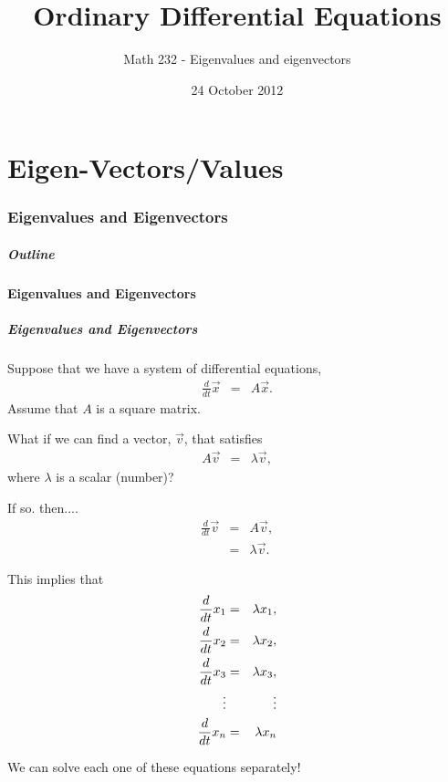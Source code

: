 \part{Eigen-Vectors/Values}
\section{Eigenvalues and Eigenvectors}


\title{Ordinary Differential Equations}
\subtitle{Math 232 - Eigenvalues and eigenvectors}
\date{24 October 2012}

\begin{frame}
  \titlepage
\end{frame}

\begin{frame}
  \frametitle{Outline}
\end{frame}


\subsection{Eigenvalues and Eigenvectors}


\begin{frame}
  \frametitle{Eigenvalues and Eigenvectors}

  Suppose that we have a system of differential equations,
  \begin{eqnarray*}
    \frac{d}{dt} \vec{x} & = & A \vec{x}.
  \end{eqnarray*}
  Assume that $A$ is a square matrix.

  What if we can find a vector, $\vec{v}$, that satisfies
  \begin{eqnarray*}
    A \vec{v} & = & \lambda \vec{v},
  \end{eqnarray*}
  where $\lambda$ is a scalar (number)?

\end{frame}


\begin{frame}
  If so. then....
  \begin{eqnarray*}
    \frac{d}{dt} \vec{v} & = & A \vec{v}, \\
    & = & \lambda \vec{v}.
  \end{eqnarray*}
  
  This implies that
  \begin{eqnarray*}
    \deriv{x_1}{t} & = & \lambda x_1, \\
    \deriv{x_2}{t} & = & \lambda x_2, \\
    \deriv{x_3}{t} & = & \lambda x_3, \\
    \vdots         &   & \vdots \\
    \deriv{x_n}{t} & = & \lambda x_n
  \end{eqnarray*}

  We can solve each one of these equations separately!

\end{frame}


